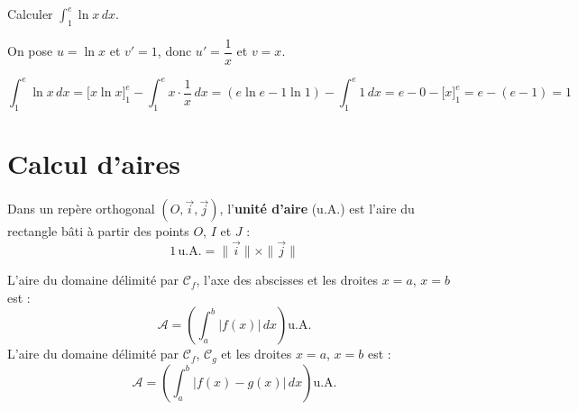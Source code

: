 \begin{exemple}
  Calculer $\displaystyle\int_1^e \ln x\,dx$.

  \medskip
  On pose $u = \ln x$ et $v' = 1$,
  donc $u' = \dfrac{1}{x}$ et $v = x$.

  \[
    \int_1^e \ln x\,dx
    = \bigl[x\ln x\bigr]_1^e - \int_1^e x \cdot \frac{1}{x}\,dx
    = (e\ln e - 1\ln 1) - \int_1^e 1\,dx
    = e - 0 - \bigl[x\bigr]_1^e
    = e - (e - 1) = 1
  \]
\end{exemple}

\section{Calcul d'aires}

\begin{definition}
  Dans un rep\`{e}re orthogonal $(O,\vec{i},\vec{j})$,
  l'\textbf{unit\'{e} d'aire} (u.A.) est l'aire du rectangle bâti
  \`{a} partir des points $O$, $I$ et $J$ :
  \[
    1\,\text{u.A.} = \|\vec{i}\| \times \|\vec{j}\|
  \]
\end{definition}

\begin{propriete}
  L'aire du domaine d\'{e}limit\'{e} par $\mathcal{C}_f$, l'axe des abscisses
  et les droites $x = a$, $x = b$ est :
  \[
    \mathcal{A} = \left(\int_a^b \bigl|f(x)\bigr|\,dx\right)\text{u.A.}
  \]
  L'aire du domaine d\'{e}limit\'{e} par $\mathcal{C}_f$, $\mathcal{C}_g$
  et les droites $x = a$, $x = b$ est :
  \[
    \mathcal{A} = \left(\int_a^b \bigl|f(x)-g(x)\bigr|\,dx\right)\text{u.A.}
  \]
\end{propriete}

